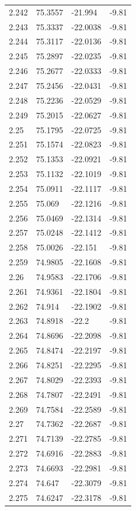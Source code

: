 \begin{tabular}{llll}
2.242 & 75.3557 & -21.994 & -9.81 \\
2.243 & 75.3337 & -22.0038 & -9.81 \\
2.244 & 75.3117 & -22.0136 & -9.81 \\
2.245 & 75.2897 & -22.0235 & -9.81 \\
2.246 & 75.2677 & -22.0333 & -9.81 \\
2.247 & 75.2456 & -22.0431 & -9.81 \\
2.248 & 75.2236 & -22.0529 & -9.81 \\
2.249 & 75.2015 & -22.0627 & -9.81 \\
2.25 & 75.1795 & -22.0725 & -9.81 \\
2.251 & 75.1574 & -22.0823 & -9.81 \\
2.252 & 75.1353 & -22.0921 & -9.81 \\
2.253 & 75.1132 & -22.1019 & -9.81 \\
2.254 & 75.0911 & -22.1117 & -9.81 \\
2.255 & 75.069 & -22.1216 & -9.81 \\
2.256 & 75.0469 & -22.1314 & -9.81 \\
2.257 & 75.0248 & -22.1412 & -9.81 \\
2.258 & 75.0026 & -22.151 & -9.81 \\
2.259 & 74.9805 & -22.1608 & -9.81 \\
2.26 & 74.9583 & -22.1706 & -9.81 \\
2.261 & 74.9361 & -22.1804 & -9.81 \\
2.262 & 74.914 & -22.1902 & -9.81 \\
2.263 & 74.8918 & -22.2 & -9.81 \\
2.264 & 74.8696 & -22.2098 & -9.81 \\
2.265 & 74.8474 & -22.2197 & -9.81 \\
2.266 & 74.8251 & -22.2295 & -9.81 \\
2.267 & 74.8029 & -22.2393 & -9.81 \\
2.268 & 74.7807 & -22.2491 & -9.81 \\
2.269 & 74.7584 & -22.2589 & -9.81 \\
2.27 & 74.7362 & -22.2687 & -9.81 \\
2.271 & 74.7139 & -22.2785 & -9.81 \\
2.272 & 74.6916 & -22.2883 & -9.81 \\
2.273 & 74.6693 & -22.2981 & -9.81 \\
2.274 & 74.647 & -22.3079 & -9.81 \\
2.275 & 74.6247 & -22.3178 & -9.81 \\

\end{tabular}
